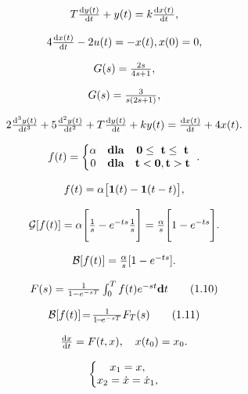 \documentclass{article}
\begin{document}
\[
$$
T \frac{\mathrm{d} y ( t )} {\mathrm{d} t}+y ( t )=k \frac{\mathrm{d} x ( t )} {\mathrm{d} t},
$$
\]

\[
$$
4 \frac{\mathrm{d} x ( t )} {\mathrm{d} t}-2 u ( t )=-x ( t ), \begin{matrix} {x ( 0 )=0,} \\ \end{matrix}
$$
\]

\[
$$
G ( s )=\frac{2 s} {4 s+1},
$$
\]

\[
$$
G ( s )={\frac{3} {s ( 2 s+1 )}},
$$
\]

\[
$$
2 {\frac{\mathrm{d}^{3} y ( t )} {\mathrm{d} t^{3}}}+5 {\frac{\mathrm{d}^{2} y ( t )} {\mathrm{d} t^{2}}}+T {\frac{\mathrm{d} y ( t )} {\mathrm{d} t}}+k y ( t )={\frac{\mathrm{d} x ( t )} {\mathrm{d} t}}+4 x ( t ).
$$
\]

\[
$$
f ( t )=\left\{\begin{matrix} {\alpha} & {\mathrm{\bf d l a}} & {\mathrm{\bf0 \leq~ t \leq~ t ~}} \\ {0} & {\mathrm{\bf d l a}} & {\mathrm{\bf t < 0, t > t ~}} \\ \end{matrix} \right..
$$
\]

\[
$$
f ( t )=\alpha{\big[} {\bf1} ( t )-{\bf1} ( t-t ) {\big]},
$$
\]

\[
$$
\mathcal{G} [ f ( t ) ]=\alpha\Bigg[ \frac{1} {s}-e^{-t s} \frac{1} {s} \Bigg]=\frac{\alpha} {s} \Bigg[ 1-e^{-t s} \Bigg].
$$
\]

\[
$$
{\mathcal{B}} [ f ( t ) ]={\frac{\alpha} {s}} [ 1-e^{-t s} ].
$$
\]

\[
$$
F ( s )=\frac{1} {1-e^{-s T}} \int_{0}^{T} f ( t ) e^{-s t} {\bf d} t \tag{1.10}
$$
\]

\[
$$
{\cal B} [ f ( t ) ] \!=\! {\frac{1} {1 \!-\! e^{-s T}}} F_{T} ( s ) \tag{1.11}
$$
\]

\[
$$
\frac{\mathrm{d} x} {\mathrm{d} t}=F ( t, x ), \quad x ( t_{0} )=x_{0}.
$$
\]

\[
$$
\left\{\begin{matrix} x_{1}=x, \\ x_{2}=\dot{x}=\dot{x}_{1}, \end{matrix} \right.
$$
\]
\end{document}
